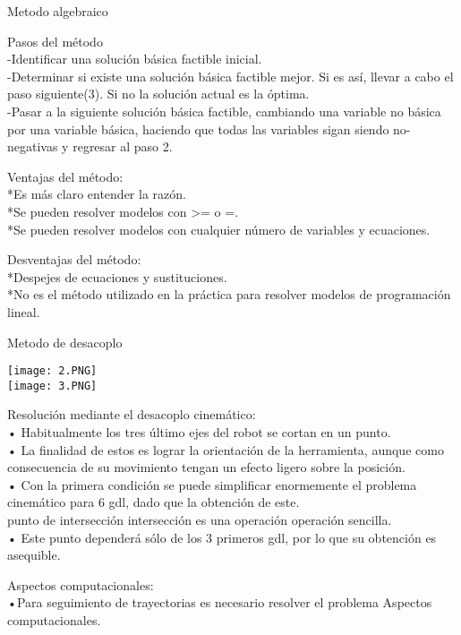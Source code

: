 \documentclass[12pt,letterpaper]{report}
\begin{document}
\begin{center}
\begin{flushleft}
\begin{flushleft}
\begin{flushleft}
\begin{flushleft}
Metodo algebraico
\begin{flushleft}
Pasos del método\\
-Identificar una solución básica factible inicial.\\
-Determinar si existe una solución básica factible mejor. Si es así, llevar a cabo el paso siguiente(3). Si no la solución actual es la óptima.\\
-Pasar a la siguiente solución básica factible, cambiando una variable no básica por una variable básica, haciendo que todas las variables sigan siendo no-negativas y regresar al paso 2.
\begin{flushleft}
Ventajas del método:\\
*Es más claro entender la razón.\\
*Se pueden resolver modelos con >= o =.\\
*Se pueden resolver modelos con cualquier número de variables y ecuaciones.
\begin{flushleft}
Desventajas del método:\\
*Despejes de ecuaciones y sustituciones.\\
*No es el método utilizado en la práctica para resolver modelos de programación lineal.
\begin{flushleft}
Metodo de desacoplo
\begin{center}
\texttt{[image: 2.PNG]} \\
\texttt{[image: 3.PNG]} 
\begin{flushleft}
Resolución mediante el desacoplo cinemático:\\
• Habitualmente los tres último ejes del robot se cortan en un
punto.\\
• La finalidad de estos es lograr la orientación de la herramienta,
aunque como consecuencia de su movimiento tengan un efecto
ligero sobre la posición.\\
• Con la primera condición se puede simplificar enormemente el
problema cinemático para 6 gdl, dado que la obtención de este.\\
punto de intersección intersección es una operación operación sencilla.\\
• Este punto dependerá sólo de los 3 primeros gdl, por lo que su
obtención es asequible.
\begin{flushleft}
Aspectos computacionales: \\
•Para seguimiento de trayectorias es necesario resolver el problema
Aspectos computacionales.\\

\end{flushleft}
\end{flushleft}
\end{center}
\end{flushleft}
\end{flushleft}
\end{flushleft}
\end{flushleft}
\end{flushleft}
\end{flushleft}
\end{flushleft}
\end{flushleft}
\end{center}
\end{document}
